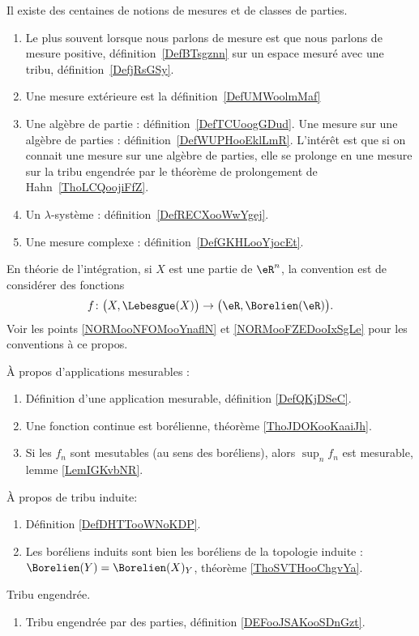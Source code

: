 

  \label{INTooVDSCooHXLLKp}
Il existe des centaines de notions de mesures et de classes de parties.
\begin{enumerate}
	\item
	      Le plus souvent lorsque nous parlons de mesure est que nous parlons de mesure positive, définition~\ref{DefBTsgznn} sur un espace mesuré avec une tribu, définition~\ref{DefjRsGSy}.
	\item
	      Une mesure extérieure est la définition~\ref{DefUMWoolmMaf}
	\item
	      Une algèbre de partie : définition~\ref{DefTCUoogGDud}. Une mesure sur une algèbre de parties : définition~\ref{DefWUPHooEklLmR}. L'intérêt est que si on connait une mesure sur une algèbre de parties, elle se prolonge en une mesure sur la tribu engendrée par le théorème de prolongement de Hahn~\ref{ThoLCQoojiFfZ}.
	\item
	      Un \( \lambda\)-système : définition~\ref{DefRECXooWwYgej}.
	\item
	      Une mesure complexe : définition~\ref{DefGKHLooYjocEt}.
\end{enumerate}

En théorie de l'intégration, si \( X\) est une partie de \( \eR^n\), la convention est de considérer des fonctions
\begin{equation*}
	f\colon \big( X,\Lebesgue(X) \big)\to \big( \eR,\Borelien(\eR) \big).
\end{equation*}
Voir les points \ref{NORMooNFOMooYnaflN} et \ref{NORMooFZEDooIxSgLe} pour les conventions à ce propos.

À propos d'applications mesurables :
\begin{enumerate}
	\item
	      Définition d'une application mesurable, définition \ref{DefQKjDSeC}.
	\item
	      Une fonction continue est borélienne, théorème \ref{ThoJDOKooKaaiJh}.
      \item
          Si les \( f_n\) sont mesutables (au sens des boréliens), alors \( \sup_nf_n\) est mesurable, lemme \ref{LemIGKvbNR}.
\end{enumerate}


À propos de tribu induite:
\begin{enumerate}
	\item
	      Définition \ref{DefDHTTooWNoKDP}.
	\item
	      Les boréliens induits sont bien les boréliens de la topologie induite : \( \Borelien(Y)=\Borelien(X)_Y\), théorème \ref{ThoSVTHooChgvYa}.
\end{enumerate}

Tribu engendrée.
\begin{enumerate}
    \item
        Tribu engendrée par des parties, définition \ref{DEFooJSAKooSDnGzt}.
\end{enumerate}

